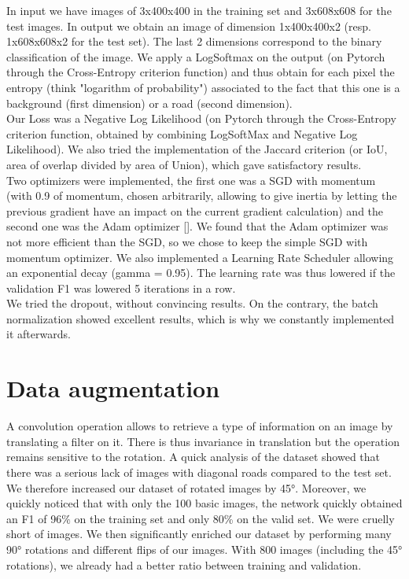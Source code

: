 \documentclass[10pt,conference,compsocconf]{IEEEtran}
\begin{document}
\FloatBarrier
In input we have images of 3x400x400 in the training set and 3x608x608 for the test images. In output we obtain an image of dimension 1x400x400x2 (resp. 1x608x608x2 for the test set). The last 2 dimensions correspond to the binary classification of the image. We apply a LogSoftmax on the output (on Pytorch through the Cross-Entropy criterion function) and thus obtain for each pixel the entropy (think "logarithm of probability") associated to the fact that this one is a background (first dimension) or a road (second dimension). \\
Our Loss was a Negative Log Likelihood (on Pytorch through the Cross-Entropy criterion function, obtained by combining LogSoftMax and Negative Log Likelihood). We also tried the implementation of the Jaccard criterion (or IoU, area of overlap divided by area of Union), which gave satisfactory results. \\
Two optimizers were implemented, the first one was a SGD with momentum (with 0.9 of momentum, chosen arbitrarily, allowing to give inertia by letting the previous gradient have an impact on the current gradient calculation) and the second one was the Adam optimizer [\cite{adam}]. We found that the Adam optimizer was not more efficient than the SGD, so we chose to keep the simple SGD with momentum optimizer.
We also implemented a Learning Rate Scheduler allowing an exponential decay (gamma = 0.95). The learning rate was thus lowered if the validation F1 was lowered 5 iterations in a row. \\
We tried the dropout, without convincing results. On the contrary, the batch normalization showed excellent results, which is why we constantly implemented it afterwards.

\section{Data augmentation}

A convolution operation allows to retrieve a type of information on an image by translating a filter on it. There is thus invariance in translation but the operation remains sensitive to the rotation. A quick analysis of the dataset showed that there was a serious lack of images with diagonal roads compared to the test set. We therefore increased our dataset of rotated images by 45°.
Moreover, we quickly noticed that with only the 100 basic images, the network quickly obtained an F1 of 96$\%$ on the training set and only 80\% on the valid set. We were cruelly short of images. We then significantly enriched our dataset by performing many 90° rotations and different flips of our images. With 800 images (including the 45° rotations), we already had a better ratio between training and validation.
\end{document}
